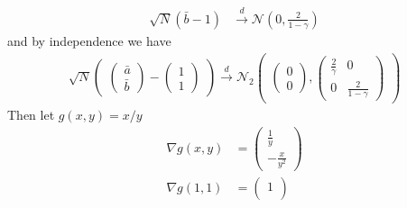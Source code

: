 \documentclass[10pt,notitlepage]{article}
\begin{document}
\begin{exercise}[Solution]
\begin{enumerate}[(a)]
\begin{align*}
                        \sqrt{N}(\bar{b}-1)&\overset{d}{\longrightarrow}\mathcal{N}\left(0,\frac{2}{1-\gamma}\right)
                    \end{align*}
                    and by independence we have
                    \begin{align*}
                        \sqrt{N}
                        \begin{pmatrix}
                            \begin{pmatrix}
                                \bar{a}\\
                                \bar{b}
                            \end{pmatrix}-
                            \begin{pmatrix}
                                1\\
                                1
                            \end{pmatrix}
                        \end{pmatrix}
                        \overset{d}{\longrightarrow}\mathcal{N}_2
                        \begin{pmatrix}
                            \begin{pmatrix}
                                0\\
                                0
                            \end{pmatrix},
                            \begin{pmatrix}
                                \frac{2}{\gamma} & 0\\
                                0 & \frac{2}{1-\gamma}
                            \end{pmatrix}
                        \end{pmatrix}
                    \end{align*}
                    Then let $g(x,y) = x/y$ 
                    \begin{align*}
                        \nabla g(x,y) &=
                        \begin{pmatrix}
                            \frac{1}{y}\\
                            -\frac{x}{y^2}
                        \end{pmatrix}\\
                        \nabla g(1,1) &=
                        \begin{pmatrix}
                            1\\

\end{pmatrix}
\end{align*}
\end{enumerate}
\end{exercise}
\end{document}

